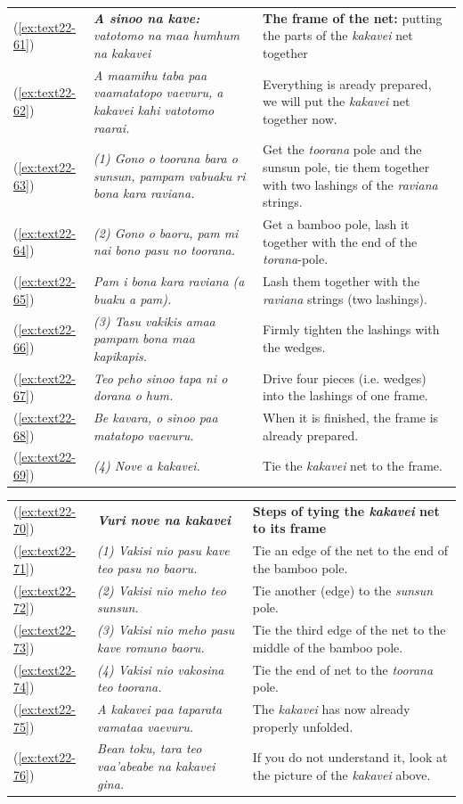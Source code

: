 \documentclass[output=paper]{langscibook}
\begin{document}
\begin{xltabular}{\textwidth}{lXX}
	(\ref{ex:text22-61})&\textit{\textbf{A sinoo na kave:} vatotomo na maa humhum na kakavei}& \textbf{The frame of the net:} putting the parts of the \textit{kakavei} net together\\
	(\ref{ex:text22-62})&\textit{A maamihu taba paa vaamatatopo vaevuru, a kakavei kahi vatotomo raarai.}&Everything is aready prepared, we will put the \textit{kakavei} net together now.\\
	(\ref{ex:text22-63})&\textit{(1) Gono o toorana bara o sunsun, pampam vabuaku ri bona kara raviana.}&Get the \textit{toorana} pole and the sunsun pole, tie them together with two lashings of the \textit{raviana} strings.\\
	(\ref{ex:text22-64})&\textit{(2) Gono o baoru, pam mi nai bono pasu no toorana.}&Get a bamboo pole, lash it together with the end of the \textit{torana}-pole.\\
	(\ref{ex:text22-65})&\textit{Pam i bona kara raviana (a buaku a pam).}&Lash them together with the \textit{raviana} strings (two lashings).\\
	(\ref{ex:text22-66})&\textit{(3) Tasu vakikis amaa pampam bona maa kapikapis.}&Firmly tighten the lashings with the wedges.\\
	(\ref{ex:text22-67})&\textit{Teo peho sinoo tapa ni o dorana o hum.}&Drive four pieces (i.e. wedges) into the lashings of one frame.\\
	(\ref{ex:text22-68})&\textit{Be kavara, o sinoo paa matatopo vaevuru.}&When it is finished, the frame is already prepared.\\
	(\ref{ex:text22-69})&\textit{(4) Nove a kakavei.}&Tie the \textit{kakavei} net to the frame.\\
\end{xltabular}
\begin{xltabular}{\textwidth}{lXX}
	(\ref{ex:text22-70})&\textit{\textbf{Vuri nove na kakavei}}&\textbf{Steps of tying the \textit{kakavei} net to its frame}\\
	(\ref{ex:text22-71})&\textit{(1) Vakisi nio pasu kave teo pasu no baoru.}&Tie an edge of the net to the end of the bamboo pole.\\
	(\ref{ex:text22-72})&\textit{(2) Vakisi nio meho teo sunsun.}&Tie another (edge) to the \textit{sunsun} pole.\\
	(\ref{ex:text22-73})&\textit{(3) Vakisi nio meho pasu kave romuno baoru.}&Tie the third edge of the net to the middle of the bamboo pole.\\
	(\ref{ex:text22-74})&\textit{(4) Vakisi nio vakosina teo toorana.}&Tie the end of net to the \textit{toorana} pole.\\
	(\ref{ex:text22-75})&\textit{A kakavei paa taparata vamataa vaevuru.}&The \textit{kakavei} has now already properly unfolded.\\
	(\ref{ex:text22-76})&\textit{Bean toku, tara teo vaa'abeabe na kakavei gina.}&If you do not understand it, look at the picture of the \textit{kakavei} above.\\
\end{xltabular}
\end{document}
